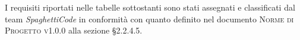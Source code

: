 \documentclass[../analisi-dei-requisiti.tex]{subfiles}
\begin{document}
I requisiti riportati nelle tabelle sottostanti sono stati assegnati e classificati dal team \emph{SpaghettiCode} in conformità con quanto definito 
nel documento \textsc{Norme di Progetto v1.0.0} alla sezione \S2.2.4.5.



\newpage



\newpage



\newpage



\newpage



\newpage



\newpage


\end{document}
